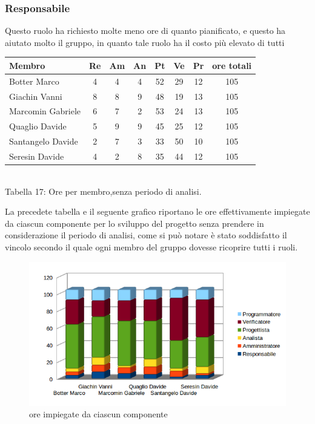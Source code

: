 \subsubsection{Responsabile}
Questo ruolo ha richiesto molte meno ore di quanto pianificato, e questo ha aiutato molto il gruppo, in quanto tale ruolo ha il costo più elevato di tutti 
\begin{center}
\begin{tabular}{| l | c | c | c | c | c | c | c |}
\hline
Membro & Re & Am & An & Pt & Ve & Pr & ore totali \\
\hline
Botter Marco & 4 & 4 & 4 & 52 & 29 & 12 & 105 \\

Giachin Vanni & 8 & 8 & 9 & 48 & 19 & 13 & 105 \\

Marcomin Gabriele & 6 & 7 & 2 & 53 & 24 & 13 & 105 \\

Quaglio Davide & 5 & 9 & 9 & 45 & 25 & 12 & 105 \\

Santangelo Davide & 2 & 7 & 3 & 33 & 50 & 10 & 105 \\

Seresin Davide & 4 & 2 & 8 & 35 & 44 & 12 & 105 \\
\hline
\end{tabular}
\\
Tabella 17: Ore per membro,senza periodo di analisi.
\end{center}
La precedete tabella e il seguente grafico riportano le ore effettivamente impiegate da ciascun componente per lo sviluppo del progetto senza prendere in considerazione il periodo di analisi, come si può notare è stato soddisfatto il vincolo secondo il quale ogni membro del gruppo dovesse ricoprire tutti i ruoli.
\begin{figure}[H] \centering \includegraphics[width=%
\textwidth]
{../modello/img/totruoli.png} \caption{ore impiegate da ciascun componente}
\end{figure}
